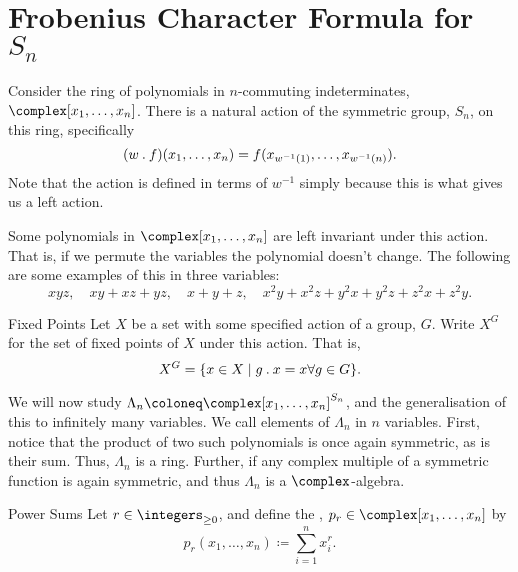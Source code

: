 \section{Frobenius Character Formula for \texorpdfstring{\(S_n\)}{Sn}}
Consider the ring of polynomials in \(n\)-commuting indeterminates, \(\complex[x_1, \dotsc, x_n]\).
There is a natural action of the symmetric group, \(S_n\), on this ring, specifically
\begin{equation}
    (w \mathbin{.} f)(x_1, \dotsc, x_n) = f(x_{w^{-1}(1)}, \dotsc, x_{w^{-1}(n)}).
\end{equation}
Note that the action is defined in terms of \(w^{-1}\) simply because this is what gives us a left action.

Some polynomials in \(\complex[x_1, \dotsc, x_n]\) are left invariant under this action.
That is, if we permute the variables the polynomial doesn't change.
The following are some examples of this in three variables:
\begin{equation}
    \label{eqn:example symmetric polynomials}
    xyz, \quad xy + xz + yz, \quad x + y + z, \quad x^2y + x^2z + y^2x + y^2z + z^2x + z^2y.
\end{equation}

\begin{ntn}{Fixed Points}{}
    Let \(X\) be a set with some specified action of a group, \(G\).
    Write \(X^G\) for the set of fixed points of \(X\) under this action.
    That is,
    \begin{equation}
        X^G = \{x \in X \mid g \mathbin{.} x = x \forall g \in G\}.
    \end{equation}
\end{ntn}

We will now study \(\Lambda_n \coloneq \complex[x_1, \dotsc, x_n]^{S_n}\), and the generalisation of this to infinitely many variables.
We call elements of \(\Lambda_n\)  in \(n\) variables.
First, notice that the product of two such polynomials is once again symmetric, as is their sum.
Thus, \(\Lambda_n\) is a ring.
Further, if any complex multiple of a symmetric function is again symmetric, and thus \(\Lambda_n\) is a \(\complex\)-algebra.

\begin{dfn}{Power Sums}{}
    Let \(r \in \integers_{\ge 0}\), and define the , \(p_r \in \complex[x_1, \dotsc, x_n]\) by
    \begin{equation}
        p_r(x_1, \dotsc, x_n) \coloneq \sum_{i=1}^n x_i^r.
    \end{equation}
\end{dfn}

